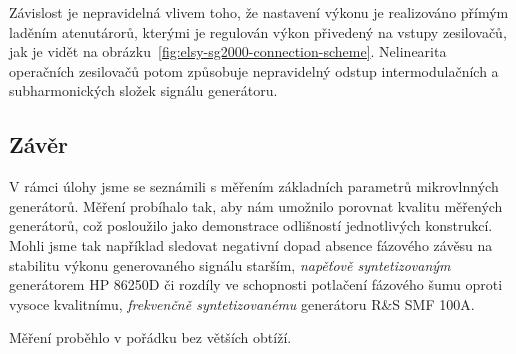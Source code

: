 \documentclass[11pt,a4paper]{article}
\begin{document}
Závislost je nepravidelná vlivem toho, že nastavení výkonu je realizováno přímým laděním atenutárorů, kterými je regulován výkon přivedený na vstupy zesilovačů, jak je vidět na obrázku~\ref{fig:elsy-sg2000-connection-scheme}. Nelinearita operačních zesilovačů potom způsobuje nepravidelný odstup intermodulačních a subharmonických složek signálu generátoru.

\subsection*{Závěr}
V rámci úlohy jsme se seznámili s měřením základních parametrů mikrovlnných generátorů. Měření probíhalo tak, aby nám umožnilo porovnat kvalitu měřených generátorů, což posloužilo jako demonstrace odlišností jednotlivých konstrukcí. Mohli jsme tak například sledovat negativní dopad absence fázového závěsu na stabilitu výkonu generovaného signálu starším, \emph{napěťově syntetizovaným} generátorem HP 86250D či rozdíly ve schopnosti potlačení fázového šumu oproti vysoce kvalitnímu, \emph{frekvenčně syntetizovanému} generátoru R\&S SMF 100A.

Měření proběhlo v pořádku bez větších obtíží.
\end{document}
